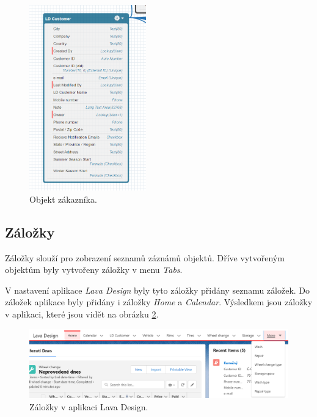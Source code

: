 \begin{figure}[h!]
    \centering
    \includegraphics[width=0.45\textwidth]{assets/7_implementace/aplikace_a_objekty/LD Customer.png}
    \caption{Objekt zákazníka.}
    \label{fig:LD_customer}
\end{figure}
\FloatBarrier
\subsection{Záložky}
Záložky slouží pro zobrazení seznamů záznámů objektů. Dříve vytvořeným objektům byly vytvořeny záložky v menu \emph{Tabs}.

V nastavení aplikace \emph{Lava Design} byly tyto záložky přidány seznamu záložek. Do záložek aplikace byly přidány i záložky \emph{Home} a \emph{Calendar}. Výsledkem jsou záložky v aplikaci, které jsou vidět na obrázku \ref{fig:LD_app_tab}.

\begin{figure}[h!]
    \centering
    \includegraphics[width=\textwidth]{assets/7_implementace/aplikace_a_objekty/LD tabs.png}
    \caption{Záložky v aplikaci Lava Design.}
    \label{fig:LD_app_tab}
\end{figure}
\FloatBarrier

